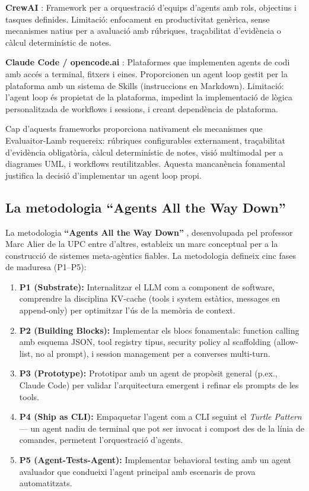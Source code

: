 \documentclass[12pt,a4paper,twoside]{report}
\begin{document}
\textbf{CrewAI} \cite{crewai2024}: Framework per a orquestraci\'o d'equips d'agents amb rols, objectius i tasques definides. Limitaci\'o: enfocament en productivitat gen\`erica, sense mecanismes natius per a avaluaci\'o amb r\'ubriques, tra\c{c}abilitat d'evid\`encia o c\`alcul determin\'istic de notes.

\textbf{Claude Code / opencode.ai} \cite{opencode}: Plataformes que implementen agents de codi amb acc\'es a terminal, fitxers i eines. Proporcionen un agent loop gestit per la plataforma amb un sistema de Skills (instruccions en Markdown). Limitaci\'o: l'agent loop \'es propietat de la plataforma, impedint la implementaci\'o de l\`ogica personalitzada de workflows i sessions, i creant depend\`encia de plataforma.

Cap d'aquests frameworks proporciona nativament els mecanismes que Evaluaitor-Lamb requereix: r\'ubriques configurables externament, tra\c{c}abilitat d'evid\`encia obligat\`oria, c\`alcul determin\'istic de notes, visi\'o multimodal per a diagrames UML, i workflows reutilitzables. Aquesta mancan\`encia fonamental justifica la decisi\'o d'implementar un agent loop propi.

\subsection{La metodologia ``Agents All the Way Down''}
\label{subsec:aawd}

La metodologia \textbf{``Agents All the Way Down''} \cite{alier2025}, desenvolupada pel professor Marc Alier de la UPC entre d'altres, estableix un marc conceptual per a la construcci\'o de sistemes meta-ag\`entics fiables. La metodologia defineix cinc fases de maduresa (P1--P5):

\begin{enumerate}
    \item \textbf{P1 (Substrate):} Internalitzar el LLM com a component de software, comprendre la disciplina KV-cache (tools i system est\`atics, messages en append-only) per optimitzar l'\'us de la mem\`oria de context.
    \item \textbf{P2 (Building Blocks):} Implementar els blocs fonamentals: function calling amb esquema JSON, tool registry tipus, security policy al scaffolding (allow-list, no al prompt), i session management per a converses multi-turn.
    \item \textbf{P3 (Prototype):} Prototipar amb un agent de prop\`osit general (p.ex., Claude Code) per validar l'arquitectura emergent i refinar els prompts de les tools.
    \item \textbf{P4 (Ship as CLI):} Empaquetar l'agent com a CLI seguint el \textit{Turtle Pattern} --- un agent nadiu de terminal que pot ser invocat i compost des de la l\'inia de comandes, permetent l'orquestraci\'o d'agents.
    \item \textbf{P5 (Agent-Tests-Agent):} Implementar behavioral testing amb un agent avaluador que condueixi l'agent principal amb escenaris de prova automatitzats.
\end{enumerate}
\end{document}
